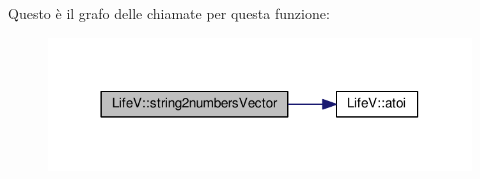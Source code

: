 Questo è il grafo delle chiamate per questa funzione\-:
\nopagebreak
\begin{figure}[H]
\begin{center}
\leavevmode
\includegraphics[width=318pt]{namespaceLifeV_a5f2c3319750ceebbeb2a3bb374a2596b_cgraph}
\end{center}
\end{figure}


